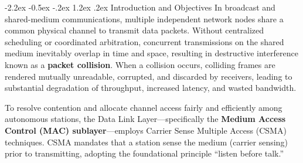 \documentclass[11pt,a4paper]{article}
\makeatletter
\renewcommand\section{\@startsection {section}{1}{\z@}%
                                   {-2.2ex \@plus -0.5ex \@minus -.2ex}%
                                   {1.2ex \@plus.2ex}%
                                   {\normalfont\Large\bfseries}}
\makeatother
\begin{document}
\section{Introduction and Objectives}
In broadcast and shared-medium communications, multiple independent network nodes share a common physical channel to transmit data packets. Without centralized scheduling or coordinated arbitration, concurrent transmissions on the shared medium inevitably overlap in time and space, resulting in destructive interference known as a \textbf{packet collision}. When a collision occurs, colliding frames are rendered mutually unreadable, corrupted, and discarded by receivers, leading to substantial degradation of throughput, increased latency, and wasted bandwidth.

To resolve contention and allocate channel access fairly and efficiently among autonomous stations, the Data Link Layer---specifically the \textbf{Medium Access Control (MAC) sublayer}---employs Carrier Sense Multiple Access (CSMA) techniques. CSMA mandates that a station sense the medium (carrier sensing) prior to transmitting, adopting the foundational principle ``listen before talk.''
\end{document}
